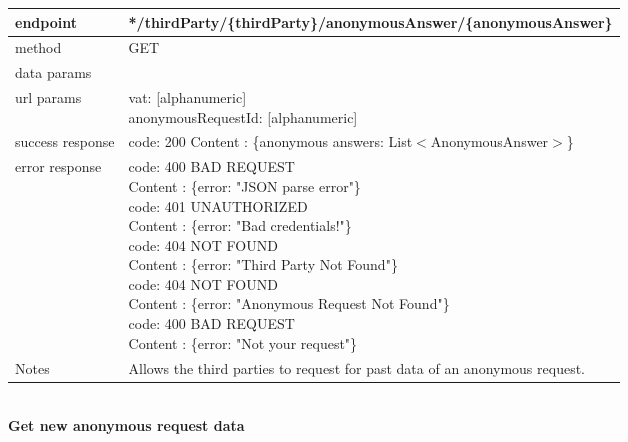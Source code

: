 \begin{legal}
\begin{legal}
\begin{itemize}
								\begin{tabularx}{\linewidth}{| l| l }
									\hline
									endpoint & */thirdParty/\{thirdParty\}/anonymousAnswer/\{anonymousAnswer\} \\
									\hline
									method & GET \\
									\hline
									data params & \\
									\hline
									url params &
									\parbox{0.7\textwidth}{
										\bigskip
										vat: [alphanumeric]\\
										anonymousRequestId: [alphanumeric]
										\bigskip
									} \\
									\hline
									success response &
									\parbox{0.7\textwidth}{
										\bigskip
										code: 200\\
										Content : \{anonymous answers: List$<$AnonymousAnswer$>$\}
										\bigskip
									} \\
									\hline
									error response &
									\parbox{0.7\textwidth}{
										\bigskip
										code: 400 BAD REQUEST \\
										Content : \{error: "JSON parse error"\}\\
										code: 401 UNAUTHORIZED \\
										Content : \{error: "Bad credentials!"\}\\
										code: 404 NOT FOUND \\
										Content : \{error: "Third Party Not Found"\}\\
										code: 404 NOT FOUND \\
										Content : \{error: "Anonymous Request Not Found"\}\\
										code: 400 BAD REQUEST \\
										Content : \{error: "Not your request"\}\\
										\bigskip
									} \\
									\hline
									Notes & 
									\parbox{0.7\textwidth}{
										\bigskip Allows the third parties to request for past data of an anonymous request.
									\bigskip}  \\
									\hline
								\end{tabularx}\\
								
								\textbf{Get new anonymous request data} \\
			

\end{itemize}
\end{legal}
\end{legal}
